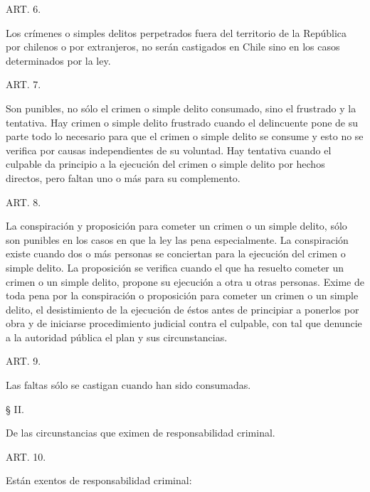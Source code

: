     ART. 6.

    Los crímenes o simples delitos perpetrados fuera del territorio de la República por chilenos o por extranjeros, no serán castigados en Chile sino en los casos determinados por la ley.


    ART. 7.

    Son punibles, no sólo el crimen o simple delito consumado, sino el frustrado y la tentativa.
    Hay crimen o simple delito frustrado cuando el delincuente pone de su parte todo lo necesario para que el crimen o simple delito se consume y esto no se verifica por causas independientes de su voluntad.
    Hay tentativa cuando el culpable da principio a la ejecución del crimen o simple delito por hechos directos, pero faltan uno o más para su complemento.



    ART. 8.

    La conspiración y proposición para cometer un crimen o un simple delito, sólo son punibles en los casos en que la ley las pena especialmente.
    La conspiración existe cuando dos o más personas se conciertan para la ejecución del crimen o simple delito.
    La proposición se verifica cuando el que ha resuelto cometer un crimen o un simple delito, propone su ejecución a otra u otras personas.
    Exime de toda pena por la conspiración o proposición para cometer un crimen o un simple delito, el desistimiento de la ejecución de éstos antes de principiar a ponerlos por obra y de iniciarse procedimiento judicial contra el culpable, con tal que denuncie a la autoridad pública el plan y sus circunstancias.




    ART. 9.

    Las faltas sólo se castigan cuando han sido consumadas.



    § II.

    De las circunstancias que eximen de responsabilidad criminal.


    ART. 10.

    Están exentos de responsabilidad criminal:

